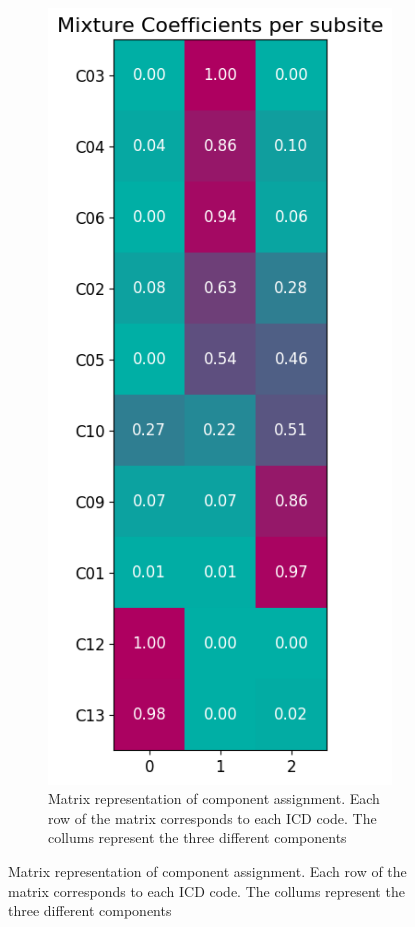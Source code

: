 \documentclass[
  sn-mathphys-num,
]{sn-jnl}
\begin{document}
\begin{figure}
\begin{minipage}{0.29\linewidth}
\begin{figure}[H]
{\includegraphics{figures/mixture_components_3.png}

}

\caption{\label{fig-3-matrix}Matrix representation of component
assignment. Each row of the matrix corresponds to each ICD code. The
collums represent the three different components}

\end{figure}%

\end{minipage}%

\end{figure}%
\end{document}
